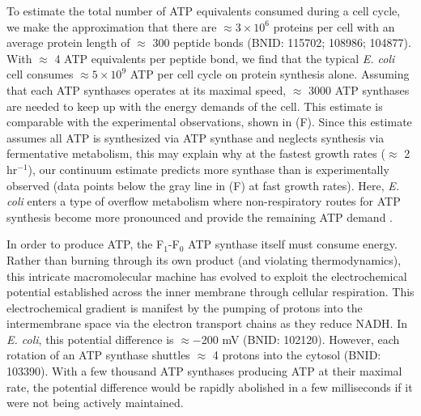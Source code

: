 To estimate the total number of ATP equivalents consumed during a cell cycle, we
make the approximation that there are $\approx 3\times10^6$ proteins per cell
with an average protein length of $\approx$ 300 peptide bonds (BNID: 115702;
108986; 104877). With $\approx$ 4 ATP equivalents per peptide bond, we find that
the typical \textit{E. coli} cell consumes $\approx 5 \times 10^9$ ATP per cell
cycle on protein synthesis alone. Assuming that each ATP synthases operates at
its maximal speed, $\approx$ 3000 ATP synthases are needed to keep up with the
energy demands of the cell. This estimate is comparable with the experimental
observations, shown in (F). Since this estimate
assumes all ATP is synthesized via ATP synthase and neglects synthesis via
fermentative metabolism, this may explain why at the fastest growth rates
($\approx$ 2 hr$^{-1}$), our continuum estimate predicts more synthase than is
experimentally observed (data points below the gray line in
(F) at fast growth rates). Here, \textit{E. coli} enters
a type of overflow metabolism where non-respiratory routes for ATP synthesis
become more pronounced and provide the remaining ATP demand \citep{molenaar2009,
zhuang2011, szenk2017} .

In order to produce ATP, the F$_1$-F$_0$ ATP synthase itself must consume
energy. Rather than burning through its own product (and violating
thermodynamics), this intricate macromolecular machine has evolved to exploit
the electrochemical potential established across the inner membrane through
cellular respiration. This electrochemical gradient is manifest by the pumping
of protons into the intermembrane space via the electron transport chains as
they reduce NADH. In \textit{E. coli}, this potential difference is $\approx
-$200 mV (BNID: 102120).
However, each rotation of an ATP
synthase shuttles $\approx$ 4 protons into the cytosol (BNID: 103390). With a few thousand ATP
synthases producing ATP at their maximal rate, the potential difference would be
rapidly abolished in a few milliseconds if it were not being actively
maintained.

